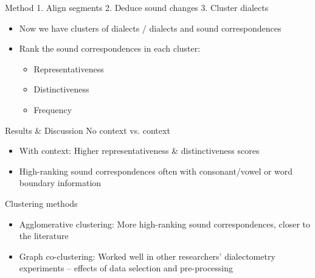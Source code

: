 \documentclass[xcolor={dvipsnames}]{beamer}
\begin{document}
\begin{frame}[t]{Method}{}
{ { 1.} Align segments \hspace{0.5em} { 2.} Deduce sound changes} \hspace{0.5em} { 3.} Cluster dialects

\vspace{4em}
\begin{itemize}
    \item  Now we have clusters of dialects / dialects and sound correspondences
    \item Rank the sound correspondences in each cluster: 
        \begin{itemize}
        \item Representativeness
        \item Distinctiveness
        \item Frequency
        \end{itemize}
\end{itemize}
\end{frame}

\begin{frame}{Results \& Discussion}
No context vs. context
\begin{itemize}
    \item With context: Higher representativeness \& distinctiveness scores
    \item High-ranking sound correspondences often with consonant/vowel or word boundary information
\end{itemize}

\pause
Clustering methods
\begin{itemize}
    \item Agglomerative clustering: More high-ranking sound correspondences, closer to the literature
    \item Graph co-clustering: Worked well in other researchers' dialectometry experiments -- effects of data selection and pre-processing
\end{itemize}
\end{frame}
\end{document}

